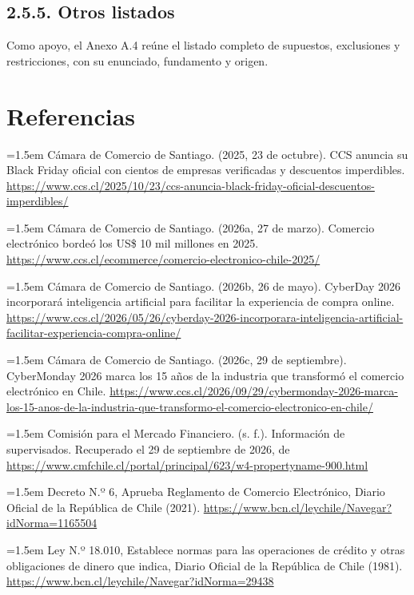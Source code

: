 \documentclass[11pt]{article}
\begin{document}
\subsection{2.5.5. Otros listados}\label{otros-listados}

Como apoyo, el Anexo A.4 reúne el listado completo de supuestos, exclusiones y restricciones, con su enunciado, fundamento y origen.

\section*{Referencias}

\noindent\hangindent=1.5em Cámara de Comercio de Santiago. (2025, 23 de octubre). CCS anuncia su Black Friday oficial con cientos de empresas verificadas y descuentos imperdibles. \url{https://www.ccs.cl/2025/10/23/ccs-anuncia-black-friday-oficial-descuentos-imperdibles/}

\noindent\hangindent=1.5em Cámara de Comercio de Santiago. (2026a, 27 de marzo). Comercio electrónico bordeó los US\$ 10 mil millones en 2025. \url{https://www.ccs.cl/ecommerce/comercio-electronico-chile-2025/}

\noindent\hangindent=1.5em Cámara de Comercio de Santiago. (2026b, 26 de mayo). CyberDay 2026 incorporará inteligencia artificial para facilitar la experiencia de compra online. \url{https://www.ccs.cl/2026/05/26/cyberday-2026-incorporara-inteligencia-artificial-facilitar-experiencia-compra-online/}

\noindent\hangindent=1.5em Cámara de Comercio de Santiago. (2026c, 29 de septiembre). CyberMonday 2026 marca los 15 años de la industria que transformó el comercio electrónico en Chile. \url{https://www.ccs.cl/2026/09/29/cybermonday-2026-marca-los-15-anos-de-la-industria-que-transformo-el-comercio-electronico-en-chile/}

\noindent\hangindent=1.5em Comisión para el Mercado Financiero. (s. f.). Información de supervisados. Recuperado el 29 de septiembre de 2026, de \url{https://www.cmfchile.cl/portal/principal/623/w4-propertyname-900.html}

\noindent\hangindent=1.5em Decreto N.º 6, Aprueba Reglamento de Comercio Electrónico, Diario Oficial de la República de Chile (2021). \url{https://www.bcn.cl/leychile/Navegar?idNorma=1165504}

\noindent\hangindent=1.5em Ley N.º 18.010, Establece normas para las operaciones de crédito y otras obligaciones de dinero que indica, Diario Oficial de la República de Chile (1981). \url{https://www.bcn.cl/leychile/Navegar?idNorma=29438}
\end{document}
